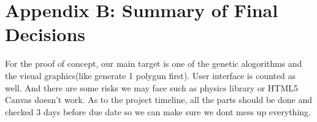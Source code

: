 \documentclass[11pt]{meetingmins}
\begin{document}
\newpage
\section{Appendix B: Summary of Final Decisions}
	For the proof of concept, our main target is one of the genetic alogorithms and the visual graphics(like generate 1 polygun first). User interface is counted as well. And there are some risks we may face such as physics library or HTML5 Canvas doesn't work. As to the project timeline, all the parts should be done and checked 3 days before due date so we can make sure we dont mess up everything.
\end{document}
